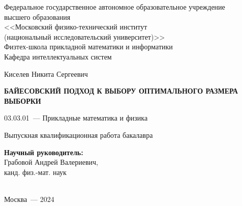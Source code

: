 \thispagestyle{empty}

\begin{titlepage}
%
\begin{center}
Федеральное государственное автономное образовательное учреждение\\ высшего образования\\
<<Московский физико-технический институт\\
(национальный исследовательский университет)>>\\
Физтех-школа прикладной математики и информатики\\
Кафедра интеллектуальных систем
\end{center}
%
\vspace{0pt plus5fill}
%
\begin{center}
\large{Киселев Никита Сергеевич}
\end{center}
%
\vspace{0pt}
%
\begin{center}
\textbf{\large{\MakeUppercase{Байесовский подход к выбору оптимального размера выборки}}}
\end{center}
%
\vspace{0pt}
%
\begin{center}
03.03.01~--- Прикладные математика и физика
\end{center}
%
\vspace{0pt}
%
\begin{center}
Выпускная квалификационная работа бакалавра
\end{center}
%
\vspace{0pt plus2fill}
%
\begin{center}
\hfill\parbox{8,4cm}{\textbf{Научный руководитель:}\\
Грабовой Андрей Валериевич,\\
канд. физ.-мат. наук}\\
\vspace{0pt plus4fill}
Москва~--- 2024    
\end{center}
%
\end{titlepage}